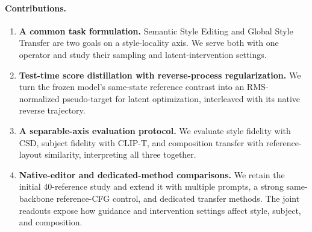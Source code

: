 \paragraph{Contributions.}
\begin{enumerate}
\item \textbf{A common task formulation.} Semantic Style Editing and Global
Style Transfer are two goals on a style-locality axis. We serve both with
one operator and study their sampling and latent-intervention settings.
\item \textbf{Test-time score distillation with reverse-process
regularization.} We turn the frozen model's same-state reference contrast
into an RMS-normalized pseudo-target for latent optimization, interleaved
with its native reverse trajectory.
\item \textbf{A separable-axis evaluation protocol.} We evaluate style
fidelity with CSD, subject fidelity with CLIP-T, and composition transfer
with reference-layout similarity, interpreting all three together.
\item \textbf{Native-editor and dedicated-method comparisons.} We retain
the initial 40-reference study and extend it with multiple prompts, a strong
same-backbone reference-CFG control, and dedicated transfer methods. The joint readouts expose how guidance and intervention settings affect
style, subject, and composition.
\end{enumerate}

